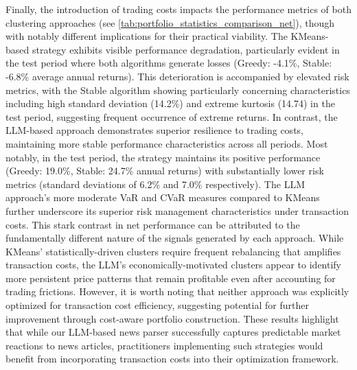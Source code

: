 
Finally, the introduction of trading costs impacts the performance metrics of both clustering approaches (see \cref{tab:portfolio_statistics_comparison_net}), though with notably different implications for their practical viability. The KMeans-based strategy exhibits visible performance degradation, particularly evident in the test period where both algorithms generate losses (Greedy: -4.1\%, Stable: -6.8\% average annual returns). This deterioration is accompanied by elevated risk metrics, with the Stable algorithm showing particularly concerning characteristics including high standard deviation (14.2\%) and extreme kurtosis (14.74) in the test period, suggesting frequent occurrence of extreme returns.
In contrast, the LLM-based approach demonstrates superior resilience to trading costs, maintaining more stable performance characteristics across all periods. Most notably, in the test period, the strategy maintains its positive performance (Greedy: 19.0\%, Stable: 24.7\% annual returns) with substantially lower risk metrics (standard deviations of 6.2\% and 7.0\% respectively). The LLM approach's more moderate VaR and CVaR measures compared to KMeans further underscore its superior risk management characteristics under transaction costs.
This stark contrast in net performance can be attributed to the fundamentally different nature of the signals generated by each approach. While KMeans' statistically-driven clusters require frequent rebalancing that amplifies transaction costs, the LLM's economically-motivated clusters appear to identify more persistent price patterns that remain profitable even after accounting for trading frictions. However, it is worth noting that neither approach was explicitly optimized for transaction cost efficiency, suggesting potential for further improvement through cost-aware portfolio construction. These results highlight that while our LLM-based news parser successfully captures predictable market reactions to news articles, practitioners implementing such strategies would benefit from incorporating transaction costs into their optimization framework.
